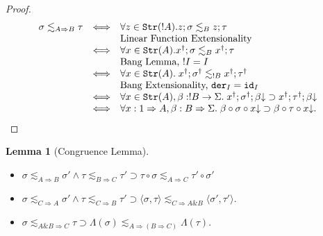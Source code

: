 \documentclass[11pt]{article}
\newtheorem{lemma}[theorem]{Lemma}
\newcommand{\Ip}[1]{\lesssim_{#1}}
\newcommand{\with}{\mbox{$\&$}}
\newcommand{\lang}{\langle}
\newcommand{\rang}{\rangle}
\begin{document}
\begin{proof}
\[\begin{array}{lll}
\sigma\Ip{A\Rightarrow B}\tau &\Longleftrightarrow &\forall z\in{\tt
  Str}(!A). z;\sigma\Ip B z;\tau \\
 & & \mbox{Linear Function Extensionality} \\
& \Longleftrightarrow & \forall x\in{\tt Str}(A).
x^{\dag};\sigma\Ip B x^{\dag};\tau \\ && \mbox{Bang Lemma, } !I =I
\\ &\Longleftrightarrow & \forall x\in{\tt Str}(A).\;
x^{\dag};\sigma^{\dag}\Ip{!B} x^{\dag};\tau^{\dag} \\ &&\mbox{Bang
Extensionality, } {\tt der}_I={\tt id}_I \\ &\Longleftrightarrow&
\forall x\in{\tt Str}(A),\beta :!B\rightarrow {\Siepinski}. \;
x^{\dag};\sigma^{\dag};\beta\converges\supset
x^{\dag};\tau^{\dag};\beta\converges \\ &\Longleftrightarrow&
\forall x: 1\Rightarrow A,\beta : B\Rightarrow {\Siepinski}.\;
\beta\circ\sigma\circ x\converges \supset\beta\circ \tau\circ
x\converges. \;\;
\end{array}\]
\end{proof}

\begin{lemma}[Congruence Lemma]
\begin{itemize}
\item[(i)] $\sigma\Ip {A\Rightarrow B}\sigma' \wedge
  \tau\Ip {B\Rightarrow C} \tau' \supset
  \tau\circ\sigma\Ip {A\Rightarrow C} \tau'\circ\sigma'$
\item[(ii)] $\sigma\Ip {C\Rightarrow A}\sigma' \wedge
  \tau\Ip {C\Rightarrow B} \tau'\supset \lang\sigma,\tau\rang
  \Ip {C\Rightarrow A\with B}\lang\sigma',\tau'\rang.$
\item[(iii)] $\sigma\Ip {A\with B\Rightarrow C}\tau\supset
\Lambda(\sigma)\Ip {A\Rightarrow(B\Rightarrow C)}\Lambda(\tau).$
\end{itemize}
\end{lemma}
\end{document}
